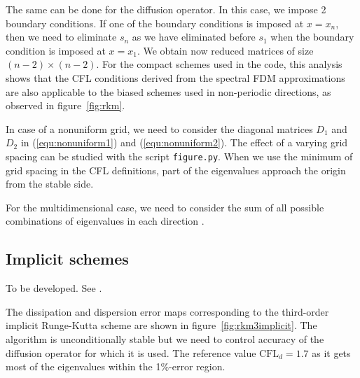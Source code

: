 {The same can be done for the diffusion operator. In this case, we impose 2 boundary conditions. If one of the boundary conditions is imposed at $x=x_n$, then we need to eliminate $s_n$ as we have eliminated before $s_1$ when the boundary condition is imposed at $x=x_1$. We obtain now reduced matrices of size $(n-2)\times(n-2)$. For the compact schemes used in the code, this analysis shows that the CFL conditions derived from the spectral FDM approximations are also applicable to the biased schemes used in non-periodic directions, as observed in figure~\ref{fig:rkm}.


In case of a nonuniform grid, we need to consider the diagonal matrices $D_1$ and $D_2$ in (\ref{equ:nonuniform1}) and (\ref{equ:nonuniform2}). The effect of a varying grid spacing can be studied with the script \texttt{figure.py}. When we use the minimum of grid spacing in the CFL definitions, part of the eigenvalues approach the origin from the stable side.

For the multidimensional case, we need to consider the sum of all possible combinations of eigenvalues in each direction \citep{Lomax:1998}.

\subsection{Implicit schemes}

To be developed. See \cite{Spalart:1991}.

The dissipation and dispersion error maps corresponding to the third-order implicit Runge-Kutta scheme are shown in figure~\ref{fig:rkm3implicit}. The algorithm is unconditionally stable but we need to control accuracy of the diffusion operator for which it is used. The reference value $\textrm{CFL}_d=1.7$ as it gets most of the eigenvalues within the 1\%-error region.

}

